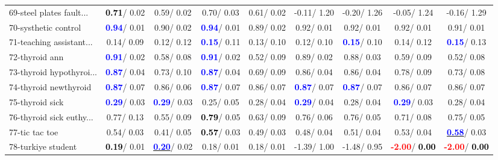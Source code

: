 \begin{table}[h]
\begin{center}
\begin{tabular}{lc|c|c|c|c|c|c|c}
69-steel plates fault... & \textcolor{black}{\textbf{  0.71}}/  0.02 &   0.59/  0.02 &   0.70/  0.03 &   0.61/  0.02 &  -0.11/  1.20 &  -0.20/  1.26 &  -0.05/  1.24 &  -0.16/  1.29 \\
70-systhetic control & \textcolor{blue}{\textbf{  0.94}}/  0.01 &   0.90/  0.02 & \textcolor{blue}{\textbf{  0.94}}/  0.01 &   0.89/  0.02 &   0.92/  0.01 &   0.92/  0.01 &   0.92/  0.01 &   0.91/  0.01 \\
71-teaching assistant... &   0.14/  0.09 &   0.12/  0.12 & \textcolor{blue}{\textbf{  0.15}}/  0.11 &   0.13/  0.10 &   0.12/  0.10 & \textcolor{blue}{\textbf{  0.15}}/  0.10 &   0.14/  0.12 & \textcolor{blue}{\textbf{  0.15}}/  0.13 \\ \hline
72-thyroid ann & \textcolor{blue}{\textbf{  0.91}}/  0.02 &   0.58/  0.08 & \textcolor{blue}{\textbf{  0.91}}/  0.02 &   0.52/  0.09 &   0.89/  0.02 &   0.88/  0.03 &   0.59/  0.09 &   0.52/  0.08 \\
73-thyroid hypothyroi... & \textcolor{blue}{\textbf{  0.87}}/  0.04 &   0.73/  0.10 & \textcolor{blue}{\textbf{  0.87}}/  0.04 &   0.69/  0.09 &   0.86/  0.04 &   0.86/  0.04 &   0.78/  0.09 &   0.73/  0.08 \\
74-thyroid newthyroid & \textcolor{blue}{\textbf{  0.87}}/  0.07 &   0.86/  0.06 & \textcolor{blue}{\textbf{  0.87}}/  0.07 &   0.86/  0.07 & \textcolor{blue}{\textbf{  0.87}}/  0.07 & \textcolor{blue}{\textbf{  0.87}}/  0.07 &   0.86/  0.07 &   0.86/  0.07 \\
75-thyroid sick & \textcolor{blue}{\textbf{  0.29}}/  0.03 & \textcolor{blue}{\textbf{  0.29}}/  0.03 &   0.25/  0.05 &   0.28/  0.04 & \textcolor{blue}{\textbf{  0.29}}/  0.04 &   0.28/  0.04 & \textcolor{blue}{\textbf{  0.29}}/  0.03 &   0.28/  0.04 \\
76-thyroid sick euthy... &   0.77/  0.13 &   0.55/  0.09 & \textcolor{black}{\textbf{  0.79}}/  0.05 &   0.63/  0.09 &   0.76/  0.06 &   0.76/  0.05 &   0.71/  0.08 &   0.75/  0.05 \\
77-tic tac toe &   0.54/  0.03 &   0.41/  0.05 & \textcolor{black}{\textbf{  0.57}}/  0.03 &   0.49/  0.03 &   0.48/  0.04 &   0.51/  0.04 &   0.53/  0.04 & \underline{\textcolor{blue}{\textbf{  0.58}}}/  0.03 \\
78-turkiye student & \textcolor{black}{\textbf{  0.19}}/  0.01 & \underline{\textcolor{blue}{\textbf{  0.20}}}/  0.02 &   0.18/  0.01 &   0.18/  0.01 &  -1.39/  1.00 &  -1.48/  0.95 & \textcolor{red}{\textbf{ -2.00}}/\textcolor{black}{\textbf{  0.00}} & \textcolor{red}{\textbf{ -2.00}}/\textcolor{black}{\textbf{  0.00}} \\ \hline

\end{tabular}
\end{center}
\end{table}
